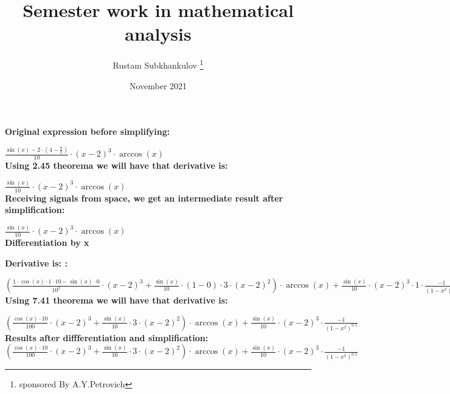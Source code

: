 \documentclass[a4paper, 12pt] {article}
\title{Semester work in mathematical analysis}
\author{Rustam Subkhankulov \thanks{sponsored By A.Y.Petrovich}}
\date{November 2021}
\begin{document}
 
\maketitle
\newpage



 \textbf{Original expression before simplifying:}

\begin{math}
 \frac {\sin(x)-2 \cdot (4- \frac {8}{2})}{10} \cdot (x-2)^3 \cdot \arccos(x)
\end{math} 
 \\ 




 \textbf{Using 2.45 theorema we will have that derivative is:}

\begin{math}
 \frac {\sin(x)}{10} \cdot (x-2)^3 \cdot \arccos(x)
\end{math} \\ 




 \textbf{Receiving signals from space, we get an intermediate result after simplification:}

\begin{math}
 \frac {\sin(x)}{10} \cdot (x-2)^3 \cdot \arccos(x)
\end{math} 
 \\ 


 \textbf{Differentiation by x}



 \textbf{Derivative is: :}

\begin{math}
( \frac {1 \cdot \cos(x) \cdot 1 \cdot 10-\sin(x) \cdot 0}{10^2} \cdot (x-2)^3+ \frac {\sin(x)}{10} \cdot (1-0) \cdot 3 \cdot (x-2)^2) \cdot \arccos(x)+ \frac {\sin(x)}{10} \cdot (x-2)^3 \cdot 1 \cdot  \frac {-1}{(1-x^2)^0.5}
\end{math} 
 \\ 




 \textbf{Using 7.41 theorema we will have that derivative is:}

\begin{math}
( \frac {\cos(x) \cdot 10}{100} \cdot (x-2)^3+ \frac {\sin(x)}{10} \cdot 3 \cdot (x-2)^2) \cdot \arccos(x)+ \frac {\sin(x)}{10} \cdot (x-2)^3 \cdot  \frac {-1}{(1-x^2)^0.5}
\end{math} \\ 



\textbf{Results after diffferentiation and simplification:}
 \begin{math}
( \frac {\cos(x) \cdot 10}{100} \cdot (x-2)^3+ \frac {\sin(x)}{10} \cdot 3 \cdot (x-2)^2) \cdot \arccos(x)+ \frac {\sin(x)}{10} \cdot (x-2)^3 \cdot  \frac {-1}{(1-x^2)^0.5}
 \end{math}
\end{document}
